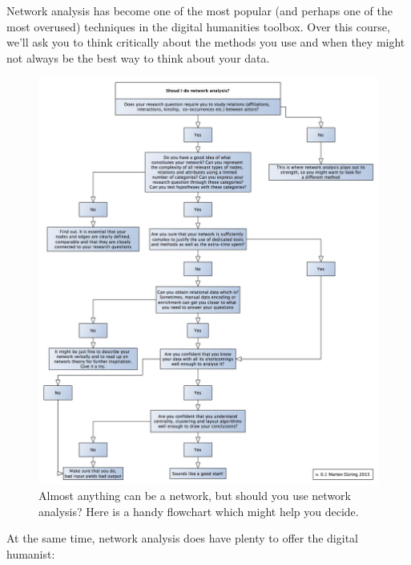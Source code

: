 \documentclass[
]{book}
\begin{document}
Network analysis has become one of the most popular (and perhaps one of the most overused) techniques in the digital humanities toolbox. Over this course, we'll ask you to think critically about the methods you use and when they might not always be the best way to think about your data.

\begin{figure}
\centering
\includegraphics[width=5.20833in,height=\textheight]{images/shouldyoudonetworkanalysis_xxl.jpg}
\caption{Almost anything can be a network, but should you use network analysis? Here is a handy flowchart which might help you decide.}
\end{figure}

At the same time, network analysis does have plenty to offer the digital humanist:
\end{document}
